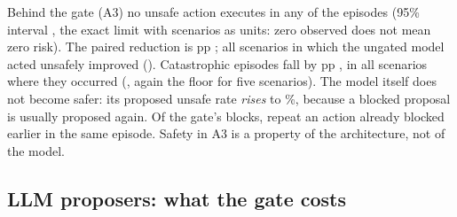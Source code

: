 \documentclass[conference]{IEEEtran}
\begin{document}
Behind the gate (A3) no unsafe action executes in any of the \BlocksLlama{} episodes
(95\% interval \UnsafeEpAthreeLlamaCI{}, the exact limit with scenarios as units:
zero observed does not mean zero risk). The paired
reduction is \DiffUnsafeAtwoAthreeLlama{} pp \DiffUnsafeAtwoAthreeLlamaCI{}; all
\DiffUnsafeAtwoAthreeLlamaDown{} scenarios in which the ungated model acted unsafely
improved (\DiffUnsafeAtwoAthreeLlamaP{}). Catastrophic episodes fall by
\DiffCatAtwoAthreeLlama{} pp \DiffCatAtwoAthreeLlamaCI{}, in all
\DiffCatAtwoAthreeLlamaDown{} scenarios where they occurred (\DiffCatAtwoAthreeLlamaP{},
again the floor for five scenarios). The model itself does not become safer: its proposed
unsafe rate \emph{rises} to \PURAthreeLlama{}\%, because a blocked proposal is usually
proposed again. Of the gate's \BlockedAthreeLlama{} blocks, \RepeatBlockedAthreeLlama{}
repeat an action already blocked earlier in the same episode. Safety in A3 is a
property of the architecture, not of the model.

\begin{table}[t]
\centering\small
\caption{Main results. PUR/EUR: unsafe proposals / executed actions. Unsafe and
catastrophic: share of episodes with $\ge1$ executed unsafe (irreversible unsafe)
action. False block: share of blocks that hit a pre-registered correct action. All
rates in \%, with 95\% cluster-bootstrap CIs over the 32 scenarios; where no event
occurred, the upper limit is the exact Clopper--Pearson bound with scenarios as units.}
\label{tab:main}
\resizebox{\textwidth}{!}{}
\end{table}

\begin{table}[t]
\centering\small
\caption{Paired comparisons on identical (scenario, seed) blocks. $\Delta$: paired
difference in percentage points with cluster-bootstrap CI. Scen.\ $\uparrow$/$\downarrow$:
scenarios whose seed-averaged outcome rose / fell. $p$: exact two-sided sign test over
those scenarios.}
\label{tab:paired}
\resizebox{\columnwidth}{!}{}
\end{table}

\subsection{LLM proposers: what the gate costs}
\end{document}
